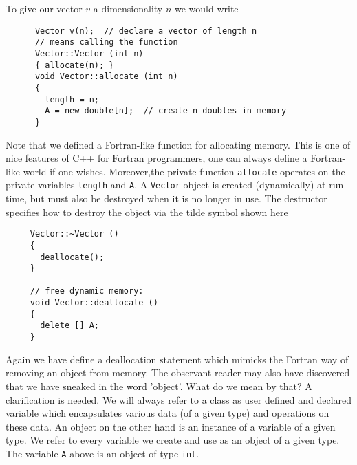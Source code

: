 To give our vector $v$ a dimensionality $n$ we would write 
\begin{lstlisting}
      Vector v(n);  // declare a vector of length n
      // means calling the function
      Vector::Vector (int n)
      { allocate(n); }
      void Vector::allocate (int n)
      {
        length = n;
        A = new double[n];  // create n doubles in memory
      }
\end{lstlisting}
Note that we defined a Fortran-like function for allocating memory.
This is one of nice features of C++ for Fortran programmers, one can always define
a Fortran-like world if one wishes.  
Moreover,the private function \verb?allocate? operates on the private variables
\verb?length? and \verb?A?.
A \verb?Vector? object is created (dynamically) at run time, but must 
also be destroyed when it is no longer in use. The destructor specifies how to destroy the object via the tilde
symbol shown here
\begin{lstlisting}
     Vector::~Vector ()  
     { 
       deallocate(); 
     }

     // free dynamic memory:
     void Vector::deallocate ()  
     { 
       delete [] A; 
     }
\end{lstlisting}
Again we have define a deallocation statement which mimicks the Fortran way of removing an object from
memory.
The observant reader may also have discovered that we have sneaked  in the word 'object'.
What do we mean by that?  A clarification is needed.  We will always refer to a class as
user defined and declared variable which encapsulates various data (of a given type) and operations on these
data.  An object on the other hand is an instance of a variable of a given type.
We refer to every variable we create and use as an object of a given type.  The variable \verb?A?
above is an object of type \verb?int?.
  


